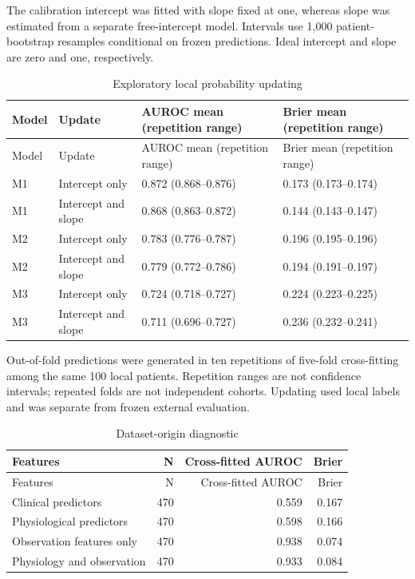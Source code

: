 \documentclass[pdflatex,sn-vancouver-num]{sn-jnl}
\begin{document}
\noindent The calibration intercept was fitted with slope fixed at one, whereas slope was estimated from a separate free-intercept model. Intervals use 1,000 patient-bootstrap resamples conditional on frozen predictions. Ideal intercept and slope are zero and one, respectively.\par\endgroup
\begingroup\scriptsize\setlength{\tabcolsep}{2pt}
\begin{longtable}{llll}
\caption{Exploratory local probability updating}\label{tab:s14}\\
\toprule
Model & Update & AUROC mean (repetition range) & Brier mean (repetition range)\\\midrule
\endfirsthead
\toprule
Model & Update & AUROC mean (repetition range) & Brier mean (repetition range)\\\midrule
\endhead
\endfoot
\bottomrule\endlastfoot
M1 & Intercept only & 0.872 (0.868--0.876) & 0.173 (0.173--0.174)\\
M1 & Intercept and slope & 0.868 (0.863--0.872) & 0.144 (0.143--0.147)\\
M2 & Intercept only & 0.783 (0.776--0.787) & 0.196 (0.195--0.196)\\
M2 & Intercept and slope & 0.779 (0.772--0.786) & 0.194 (0.191--0.197)\\
M3 & Intercept only & 0.724 (0.718--0.727) & 0.224 (0.223--0.225)\\
M3 & Intercept and slope & 0.711 (0.696--0.727) & 0.236 (0.232--0.241)\\
\end{longtable}
\noindent Out-of-fold predictions were generated in ten repetitions of five-fold cross-fitting among the same 100 local patients. Repetition ranges are not confidence intervals; repeated folds are not independent cohorts. Updating used local labels and was separate from frozen external evaluation.\par\endgroup
\begingroup\scriptsize\setlength{\tabcolsep}{2pt}
\begin{longtable}{lrrr}
\caption{Dataset-origin diagnostic}\label{tab:s15}\\
\toprule
Features & N & Cross-fitted AUROC & Brier\\\midrule
\endfirsthead
\toprule
Features & N & Cross-fitted AUROC & Brier\\\midrule
\endhead
\endfoot
\bottomrule\endlastfoot
Clinical predictors & 470 & 0.559 & 0.167\\
Physiological predictors & 470 & 0.598 & 0.166\\
Observation features only & 470 & 0.938 & 0.074\\
Physiology and observation & 470 & 0.933 & 0.084\\
\end{longtable}
\end{document}
